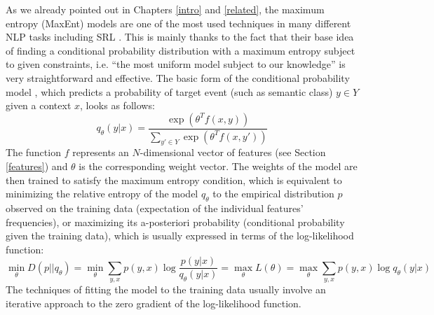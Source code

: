 \documentclass[12pt,notitlepage]{report}
\begin{document}
As we already pointed out in Chapters \ref{intro} and \ref{related}, the maximum entropy (MaxEnt) models \citep[p. 219ff.]{jelinek97} are one of the most used techniques in many different NLP tasks \citep[p. 607f.]{manning00} including SRL \citep{jiang06,zhao09,che09,chen09}. This is mainly thanks to the fact that their base idea of finding a conditional probability distribution with a maximum entropy \citep[average uncertainty][p. 61]{manning00} subject to given constraints, i.e. ``the most uniform model subject to our knowledge'' \citep[p. 41]{berger96} is very straightforward and effective. The basic form of the conditional probability model \citep{malouf02}, which predicts a probability of target event (such as semantic class) $y\in Y$ given a context $x$, looks as follows: 
\begin{equation}
q_\theta(y|x) = \frac{\exp(\theta^T f(x,y))}{\sum_{y'\in Y} \exp(\theta^T f(x,y'))}
\end{equation}
The function $f$ represents an $N$-dimensional vector of features (see Section \ref{features}) and $\theta$ is the corresponding weight vector. The weights of the model are then trained to satisfy the maximum entropy condition, which is equivalent to minimizing the relative entropy \citep[or Kullback-Leibler Divergence;][p. 72]{manning00} of the model $q_\theta$ to the empirical distribution $p$ observed on the training data (expectation of the individual features' frequencies), or maximizing its a-posteriori probability (conditional probability given the training data), which is usually expressed in terms of the log-likelihood function:
\begin{equation}\label{eq:maxent}
\min_\theta D(p||q_\theta) = \min_\theta \sum_{y,x} p(y,x) \log\frac{p(y|x)}{q_\theta(y|x)} = \max_\theta L(\theta) = \max_\theta \sum_{y,x} p(y,x) \log q_\theta(y|x)
\end{equation}
The techniques of fitting the model to the training data usually involve an iterative approach to the zero gradient of the log-likelihood function.
\end{document}
